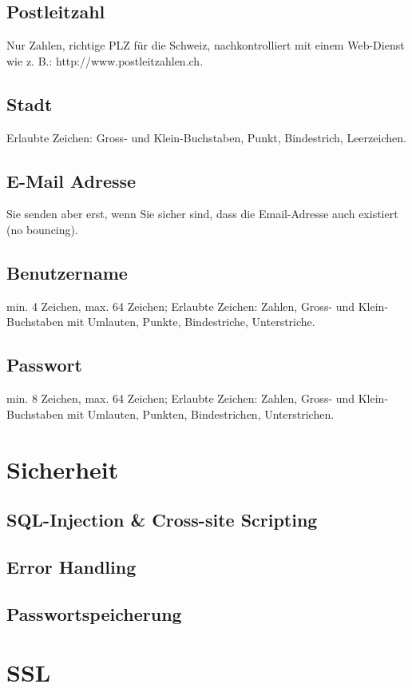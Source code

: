 \documentclass[12pt]{scrartcl}
\begin{document}
\subsection{Postleitzahl}
Nur Zahlen, richtige PLZ für die Schweiz, nachkontrolliert mit einem Web-Dienst wie z. B.: http://www.postleitzahlen.ch.

\subsection{Stadt}
Erlaubte Zeichen: Gross- und Klein-Buchstaben, Punkt, Bindestrich, Leerzeichen.

\subsection{E-Mail Adresse}
Sie senden aber erst, wenn Sie sicher sind, dass die
Email-Adresse auch existiert (no bouncing).

\subsection{Benutzername}
min. 4 Zeichen, max. 64 Zeichen; Erlaubte Zeichen:
Zahlen, Gross- und Klein-Buchstaben mit Umlauten, Punkte, Bindestriche, Unterstriche.

\subsection{Passwort}
min. 8 Zeichen, max. 64 Zeichen; Erlaubte Zeichen: Zahlen, Gross- und Klein-Buchstaben mit Umlauten, Punkten, Bindestrichen, Unterstrichen.

\section{Sicherheit}
\subsection{SQL-Injection \& Cross-site Scripting}


\subsection{Error Handling}


\subsection{Passwortspeicherung}


\section{SSL}
\end{document}
